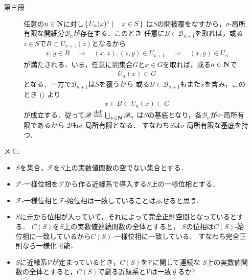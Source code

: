 \begin{prf}
\begin{description}
			\item[第三段]
				任意の$n \in \mathbf{N}$に対し$\left\{\, U_n(x)^{\mathrm{o}} \mid \quad x \in S\, \right\}$
				は$S$の開被覆をなすから，$\sigma$-局所有限な開細分$\mathscr{B}_n$が存在する．このとき
				任意に$B \in \mathscr{B}_{n+1}$を取れば，或る$z \in S$で$B \subset U_{n+1}(z)$となるから
				\begin{align}
					x,y \in B \quad\Longrightarrow\quad
					(x,z),(z,y) \in U_{n+1} \quad\Longrightarrow\quad
					(x,y) \in U_n
					\label{eq:thm_if_uniformity_has_countable_base_then_has_topology_has_sigma_locally_finite_base}
				\end{align}
				が満たされる．いま，任意に開集合$G$と$x \in G$を取れば，或る$n \in \mathbf{N}$で
				\begin{align}
					U_n(x) \subset G
				\end{align}
				となる．一方で$\mathscr{B}_{n+1}$は$S$を覆うから
				或る$B \in \mathscr{B}_{n+1}$もまた$x$を含み，このとき
				()
				より
				\begin{align}
					x \in B \subset U_n(x) \subset G
				\end{align}
				が成立する．従って$\mathscr{B} \defeq \bigcup_{n \in \N}\mathscr{B}_n$
				は$S$の基底となり，各$\mathscr{B}_n$が$\sigma$-局所有限であるから
				$\mathscr{B}$も$\sigma$-局所有限となる．
				すなわち$S$は$\sigma$-局所有限な基底を持つ．
				\QED
		\end{description}
	\end{prf}
	
	メモ:
	\begin{itemize}
		\item $S$を集合，$\mathscr{F}$を$S$上の実数値関数の空でない集合とする．
		\item $\mathscr{F}$-一様位相を$\mathscr{F}$から作る近縁系で導入する$S$上の一様位相とする．
		\item $\mathscr{F}$-一様位相と$\mathscr{F}$-始位相は一致していることは示せると思う．
		\item $S$に元から位相が入っていて，それによって完全正則空間となっているとする．
			$C(S)$を$S$上の実数値連続関数の全体とすると，
			$S$の位相は$C(S)$-始位相に一致しているから$C(S)$-一様位相に一致している．
			すなわち完全正則なら一様化可能．
		\item $S$に近縁系$\mathscr{V}$が定まっているとき，$C(S)$を$\mathscr{V}$に関して連続な
			$S$上の実数値関数の全体とすると，$C(S)$で創る近縁系と$\mathscr{V}$は一致するか?
	\end{itemize}
	
